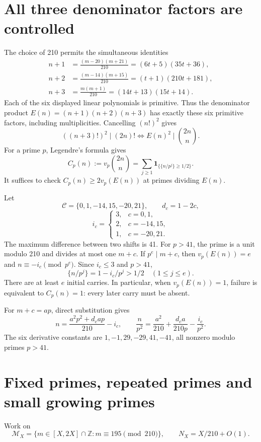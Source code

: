 \documentclass[11pt]{article}
\newcommand{\ind}{\mathbf1}\newcommand{\MX}{\mathcal M_X}\newcommand{\NX}{N_X}
\begin{document}
\section{All three denominator factors are controlled}
The choice of 210 permits the simultaneous identities
\begin{align}\label{sixfactors}
 n+1&=\frac{(m-20)(m+21)}{210}=(6t+5)(35t+36),\nonumber\\
 n+2&=\frac{(m-14)(m+15)}{210}=(t+1)(210t+181),\\
 n+3&=\frac{m(m+1)}{210}=(14t+13)(15t+14).\nonumber
\end{align}
Each of the six displayed linear polynomials is primitive. Thus the denominator
product $E(n)=(n+1)(n+2)(n+3)$ has exactly these six primitive factors, including
multiplicities. Cancelling $(n!)^2$ gives
\begin{equation}\label{criterion}
 ((n+3)!)^2\mid(2n)!\iff E(n)^2\mid\binom{2n}{n}.
\end{equation}
For a prime $p$, Legendre's formula gives
\begin{equation}\label{carries}
 C_p(n):=v_p\binom{2n}{n}
 =\sum_{j\ge1}\ind_{\{\{n/p^j\}\ge1/2\}}.
\end{equation}
It suffices to check $C_p(n)\ge2v_p(E(n))$ at primes dividing $E(n)$.

Let
\[
 \mathcal C=\{0,1,-14,15,-20,21\},\qquad d_c=1-2c,
\]
\[
 i_c=\begin{cases}3,&c=0,1,\\2,&c=-14,15,\\1,&c=-20,21.\end{cases}
\]
The maximum difference between two shifts is 41. For $p>41$, the prime is a unit
modulo 210 and divides at most one $m+c$. If $p^e\mid m+c$, then
$v_p(E(n))=e$ and $n\equiv-i_c\pmod{p^e}$. Since $i_c\le3$ and $p>41$,
\[
 \{n/p^j\}=1-i_c/p^j>1/2\quad(1\le j\le e).
\]
There are at least $e$ initial carries. In particular, when $v_p(E(n))=1$,
failure is equivalent to $C_p(n)=1$: every later carry must be absent.

For $m+c=ap$, direct substitution gives
\begin{equation}\label{ap}
 n=\frac{a^2p^2+d_cap}{210}-i_c,\qquad
 \frac n{p^2}=\frac{a^2}{210}+\frac{d_ca}{210p}-\frac{i_c}{p^2}.
\end{equation}
The six derivative constants are $1,-1,29,-29,41,-41$, all nonzero modulo
primes $p>41$.

\section{Fixed primes, repeated primes and small growing primes}
Work on
\[
 \MX=\{m\in[X,2X]\cap\mathbb Z:m\equiv195\pmod{210}\},\qquad
 \NX=X/210+O(1).
\]
\end{document}
